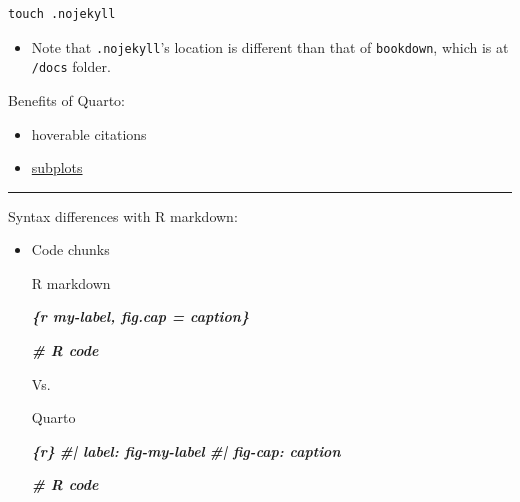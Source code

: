 \documentclass[
  a4paper,
  twoside,
  openright]{book}
\newenvironment{Shaded}{\begin{snugshade}}{\end{snugshade}}
\newcommand{\InformationTok}[1]{\textcolor[rgb]{0.56,0.35,0.01}{\textbf{\textit{#1}}}}
\providecommand{\tightlist}{%
  \setlength{\itemsep}{0pt}\setlength{\parskip}{0pt}}
\theoremstyle{definition}
\theoremstyle{definition}
\theoremstyle{definition}
\theoremstyle{definition}
\theoremstyle{remark}
\begin{document}
\begin{verbatim}
touch .nojekyll
\end{verbatim}

\begin{itemize}
\tightlist
\item
  Note that \texttt{.nojekyll}'s location is different than that of \texttt{bookdown}, which is at \texttt{/docs} folder.
\end{itemize}

Benefits of Quarto:

\begin{itemize}
\tightlist
\item
  hoverable citations
\item
  \href{https://quarto.org/docs/authoring/cross-references.html\#subfigures}{subplots}
\end{itemize}

\begin{center}\rule{0.5\linewidth}{0.5pt}\end{center}

Syntax differences with R markdown:

\begin{itemize}
\item
  Code chunks

  R markdown

\begin{Shaded}
\begin{Highlighting}[]
\InformationTok{\textasciigrave{}\textasciigrave{}\textasciigrave{}\{r my{-}label, fig.cap = caption\}}

\InformationTok{\# R code}
\InformationTok{\textasciigrave{}\textasciigrave{}\textasciigrave{}}
\end{Highlighting}
\end{Shaded}

  Vs.

  Quarto

\begin{Shaded}
\begin{Highlighting}[]
\InformationTok{\textasciigrave{}\textasciigrave{}\textasciigrave{}\{r\}}
\InformationTok{\#| label: fig{-}my{-}label}
\InformationTok{\#| fig{-}cap: caption }

\InformationTok{\# R code}
\InformationTok{\textasciigrave{}\textasciigrave{}\textasciigrave{}}
\end{Highlighting}
\end{Shaded}
\end{itemize}
\end{document}
